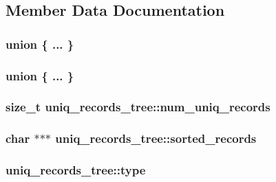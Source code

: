 \subsection{\-Member \-Data \-Documentation}
\hypertarget{structuniq__records__tree_adc7aeac454a38e2ed5bebd81107aa8cc}{\subsubsection[{"@2}]{\setlength{\rightskip}{0pt plus 5cm}union \{ ... \} }}\label{structuniq__records__tree_adc7aeac454a38e2ed5bebd81107aa8cc}
\hypertarget{structuniq__records__tree_a1de7592d69818cf846568b4ea2960926}{\subsubsection[{"@4}]{\setlength{\rightskip}{0pt plus 5cm}union \{ ... \} }}\label{structuniq__records__tree_a1de7592d69818cf846568b4ea2960926}
\hypertarget{structuniq__records__tree_ad29c48d8c32333c64850922e14f07653}{
\subsubsection[{num\-\_\-uniq\-\_\-records}]{\setlength{\rightskip}{0pt plus 5cm}size\-\_\-t {\bf uniq\-\_\-records\-\_\-tree\-::num\-\_\-uniq\-\_\-records}}}\label{structuniq__records__tree_ad29c48d8c32333c64850922e14f07653}
\hypertarget{structuniq__records__tree_afdb2f7430805f876c7c10f9c1d76266d}{
\subsubsection[{sorted\-\_\-records}]{\setlength{\rightskip}{0pt plus 5cm}char $\ast$$\ast$$\ast$ {\bf uniq\-\_\-records\-\_\-tree\-::sorted\-\_\-records}}}\label{structuniq__records__tree_afdb2f7430805f876c7c10f9c1d76266d}
\hypertarget{structuniq__records__tree_a2bd28ef4c61dd21453af3c5b1bcfae99}{
\subsubsection[{type}]{ {\bf uniq\-\_\-records\-\_\-tree\-::type}}}\label{structuniq__records__tree_a2bd28ef4c61dd21453af3c5b1bcfae99}
